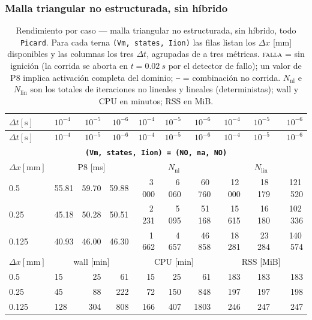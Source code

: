 \documentclass[11pt,a4paper]{article}
\newcommand{\code}[1]{\texttt{\small #1}}
\begin{document}
\subsubsection{Malla triangular no estructurada, sin híbrido}
\label{sec:res2d:triF}
\begin{center}\footnotesize
\begin{longtable}{l|lrr|rrr|rrr}
\caption{Rendimiento por caso --- malla triangular no estructurada, sin h\'ibrido, todo \code{Picard}. Para cada terna \code{(Vm, states, Iion)} las filas listan los $\Delta x$ [mm] disponibles y las columnas los tres $\Delta t$, agrupadas de a tres m\'etricas. \textsc{falla} = sin ignici\'on (la corrida se aborta en $t=\SI{0.02}{s}$ por el detector de fallo); un valor de P8 implica activaci\'on completa del dominio; \texttt{--} = combinaci\'on no corrida. $N_{\mathrm{nl}}$ e $N_{\mathrm{lin}}$ son los totales de iteraciones no lineales y lineales (deterministas); wall y CPU en minutos; RSS en MiB.}\label{tab:res2d:triF}\\
\toprule $ \Delta t [\text{s}]$ & $10^{-4}$ & $10^{-5}$ & $10^{-6}$ & $10^{-4}$ & $10^{-5}$ & $10^{-6}$ & $10^{-4}$ & $10^{-5}$ & $10^{-6}$\\ \midrule\endfirsthead
\toprule $ \Delta t [\text{s}]$ & $10^{-4}$ & $10^{-5}$ & $10^{-6}$ & $10^{-4}$ & $10^{-5}$ & $10^{-6}$ & $10^{-4}$ & $10^{-5}$ & $10^{-6}$\\ \midrule\endhead
\multicolumn{10}{c}{\textbf{\code{(Vm, states, Iion) = (NO, na, NO)}}}\\\hline
$ \Delta x [\text{mm}] $ & \multicolumn{3}{c|}{P8 [ms]} & \multicolumn{3}{c|}{$N_{\mathrm{nl}}$} & \multicolumn{3}{c|}{$N_{\mathrm{lin}}$}\\
0.5 & 55.81 & 59.70 & 59.88 & 3\,000 & 6\,060 & 60\,760 & 12\,000 & 18\,179 & 121\,520\\
0.25 & 45.18 & 50.28 & 50.51 & 2\,231 & 5\,095 & 51\,168 & 15\,615 & 16\,180 & 102\,336\\
0.125 & 40.93 & 46.00 & 46.30 & 1\,662 & 4\,657 & 46\,858 & 18\,281 & 23\,284 & 140\,574\\
\hline
$ \Delta x [\text{mm}] $ & \multicolumn{3}{c|}{wall [min]} & \multicolumn{3}{c|}{CPU [min]} & \multicolumn{3}{c|}{RSS [MiB]}\\
0.5 & 15 & 25 & 61 & 15 & 25 & 61 & 183 & 183 & 183\\
0.25 & 45 & 88 & 222 & 72 & 150 & 848 & 197 & 197 & 198\\
0.125 & 128 & 304 & 808 & 166 & 407 & 1803 & 246 & 247 & 247\\

\end{longtable}
\end{center}
\end{document}
